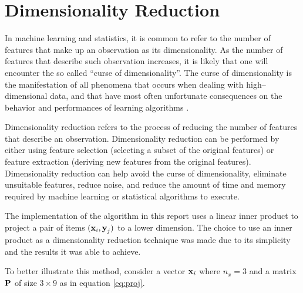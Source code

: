 \section{Dimensionality Reduction} \label{sect:theory:dim-reduction}
In machine learning and statistics, it is common to refer to the number of features that make up an observation as its dimensionality. As the number of features that describe such observation increases, it is likely that one will encounter the so called ``curse of dimensionality''. The curse of dimensionality is the manifestation of all phenomena that occurs when dealing with high--dimensional data, and that have most often unfortunate consequences on the behavior and performances of learning algorithms \cite{article:curse-of-dim}. \newline

Dimensionality reduction refers to the process of reducing the number of features that describe an observation. Dimensionality reduction can be performed by either using feature selection (selecting a subset of the original features) or feature extraction (deriving new features from the original features). Dimensionality reduction can help avoid the curse of dimensionality, eliminate unsuitable features, reduce noise, and reduce the amount of time and memory required by machine learning or statistical algorithms to execute. \newline

The implementation of the \mlblink algorithm in this report uses a linear inner product to project a pair of items $(\boldsymbol{\mathbf{x}}_i, \boldsymbol{\mathbf{y}}_j)$ to a lower dimension. The choice to use an inner product as a dimensionality reduction technique was made due to its simplicity and the results it was able to achieve. \newline

To better illustrate this method, consider a vector $\boldsymbol{\mathbf{x}}_i$ where $n_x=3$ and a matrix $\boldsymbol{\mathbf{P}}$ of size $3 \times 9$ as in equation \ref{eq:proj}.

